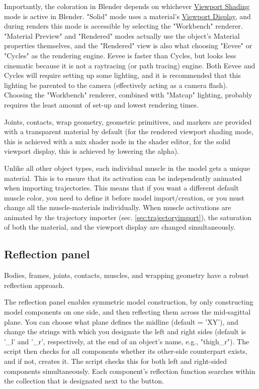 \documentclass{article}
\begin{document}
Importantly, the coloration in Blender depends on whichever \href{https://docs.blender.org/manual/en/latest/editors/3dview/display/shading.html}{Viewport Shading} mode is active in Blender. "Solid" mode uses a material's \href{https://docs.blender.org/manual/en/latest/render/workbench/display_settings.html#properties-material-viewport-display}{Viewport Display}, and during renders this mode is accessible by selecting the "Workbench" renderer. "Material Preview" and "Rendered" modes actually use the object's Material properties themselves, and the "Rendered" view is also what choosing "Eevee" or "Cycles" as the rendering engine. Eevee is faster than Cycles, but looks less cinematic because it is not a raytracing (or path tracing) engine. Both Eevee and Cycles will require setting up some lighting, and it is recommended that this lighting be parented to the camera (effectively acting as a camera flash). Choosing the "Workbench" renderer, combined with "Matcap" lighting, probably requires the least amount of set-up and lowest rendering times.

Joints, contacts, wrap geometry, geometric primitives, and markers are provided with a transparent material by default (for the rendered viewport shading mode, this is achieved with a mix shader node in the shader editor, for the solid viewport display, this is achieved by lowering the alpha).

Unlike all other object types, each individual muscle in the model gets a unique material. This is to ensure that its activation can be independently animated when importing trajectories. This means that if you want a different default muscle color, you need to define it before model import/creation, or you must change all the muscle-materials individually. When muscle activations are animated by the trajectory importer (sec. \ref{sec:trajectoryimport}), the saturation of both the material, and the viewport display are changed simultaneously.

\subsection{Reflection panel}

Bodies, frames, joints, contacts, muscles, and wrapping geometry have a robust reflection approach.

The reflection panel enables symmetric model construction, by only constructing model components on one side, and then reflecting them across the mid-sagittal plane. You can choose what plane defines the midline (default = 'XY'), and change the strings with which you designate the left and right sides (default is '\_l' and '\_r', respectively, at the end of an object's name, e.g., "thigh\_r"). The script then checks for all components whether its other-side counterpart exists, and if not, creates it. The script checks this for both left and right-sided components simultaneously. Each component's reflection function searches within the collection that is designated next to the button.
\end{document}
